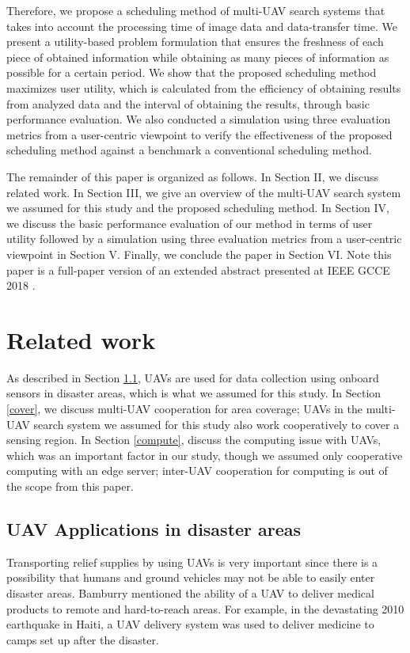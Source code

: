 \documentclass{ieeeaccess}
\begin{document}
Therefore, we propose a scheduling method of multi-UAV search systems that takes into account the processing time of image data and data-transfer time. We present a utility-based problem formulation that ensures the freshness of each piece of obtained information while obtaining as many pieces of information as possible for a certain period. We show that the proposed scheduling method maximizes user utility, which is calculated from the efficiency of obtaining results from analyzed data and the interval of obtaining the results, through basic performance evaluation. We also conducted a simulation using three evaluation metrics from a user-centric viewpoint to verify the effectiveness of the proposed scheduling method against a benchmark a conventional scheduling method.

The remainder of this paper is organized as follows. In Section II, we discuss related work. In Section III, we give an overview of the multi-UAV search system we assumed for this study and the proposed scheduling method. In Section IV, we discuss the basic performance evaluation of our method in terms of user utility followed by a simulation using three evaluation metrics from a user-centric viewpoint in Section V. Finally, we conclude the paper in Section VI. Note this paper is a full-paper version of an extended abstract presented at IEEE GCCE 2018 \cite{GCCE2018}. 


\section{Related work}
As described in Section \ref{app}, UAVs are used for data collection using onboard sensors in disaster areas, which is what we assumed for this study. In Section \ref{cover}, we discuss multi-UAV cooperation for area coverage; UAVs in the multi-UAV search system we assumed for this study also work cooperatively to cover a sensing region. In Section \ref{compute}, discuss the computing issue with UAVs, which was an important factor in our study, though we assumed only cooperative computing with an edge server; inter-UAV cooperation for computing is out of the scope from this paper.

\subsection{UAV Applications in disaster areas}\label{app}
Transporting relief supplies by using UAVs is very important since there is a possibility that humans and ground vehicles may not be able to easily enter disaster areas.
Bamburry mentioned the ability of a UAV to deliver medical products to remote and hard-to-reach areas\cite{Bamburry2015}.
For example, in the devastating 2010 earthquake in Haiti, a UAV delivery system was used to deliver medicine to camps set up after the disaster\cite{May2015}.
\end{document}
